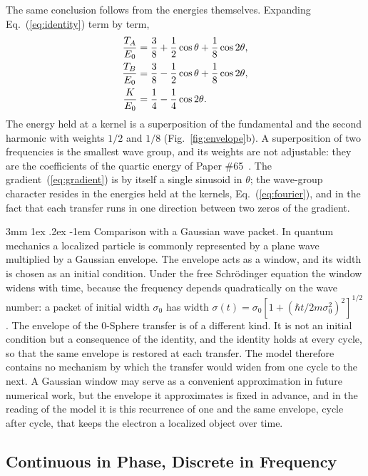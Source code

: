 \documentclass[%
 reprint, amsmath,amssymb, aps, prb, ]{revtex4-2}
\makeatletter
\numberwithin{equation}{section}
\renewcommand\paragraph{%
  \@startsection{paragraph}{4}{\z@}%
    {3mm \@plus 1ex \@minus .2ex}%
    {-1em}%
    {\normalfont\normalsize\itshape}}
\makeatother
\begin{document}
The same conclusion follows from the energies themselves. Expanding Eq.~(\ref{eq:identity}) term by term,
\begin{align}
\frac{T_A}{E_0} &= \frac38 + \frac12\cos\theta + \frac18\cos2\theta,
\notag\\
\frac{T_B}{E_0} &= \frac38 - \frac12\cos\theta + \frac18\cos2\theta,
\notag\\
\frac{K}{E_0} &= \frac14 - \frac14\cos2\theta.
\label{eq:fourier}
\end{align}
The energy held at a kernel is a superposition of the fundamental and the second harmonic with weights $1/2$ and $1/8$ (Fig.~\ref{fig:envelope}b). A superposition of two frequencies is the smallest wave group, and its weights are not adjustable: they are the coefficients of the quartic energy of Paper \#65~\cite{H65}. The gradient~(\ref{eq:gradient}) is by itself a single sinusoid in $\theta$; the wave-group character resides in the energies held at the kernels, Eq.~(\ref{eq:fourier}), and in the fact that each transfer runs in one direction between two zeros of the gradient.

\paragraph{Comparison with a Gaussian wave packet.} In quantum mechanics a localized particle is commonly represented by a plane wave multiplied by a Gaussian envelope. The envelope acts as a window, and its width is chosen as an initial condition. Under the free Schr\"odinger equation the window widens with time, because the frequency depends quadratically on the wave number: a packet of initial width $\sigma_0$ has width $\sigma(t) = \sigma_0[1 + (\hbar t/2m\sigma_0^2)^2]^{1/2}$. The envelope of the 0-Sphere transfer is of a different kind. It is not an initial condition but a consequence of the identity, and the identity holds at every cycle, so that the same envelope is restored at each transfer. The model therefore contains no mechanism by which the transfer would widen from one cycle to the next. A Gaussian window may serve as a convenient approximation in future numerical work, but the envelope it approximates is fixed in advance, and in the reading of the model it is this recurrence of one and the same envelope, cycle after cycle, that keeps the electron a localized object over time.

\subsection{Continuous in Phase, Discrete in Frequency}
\label{app:discrete}
\end{document}
